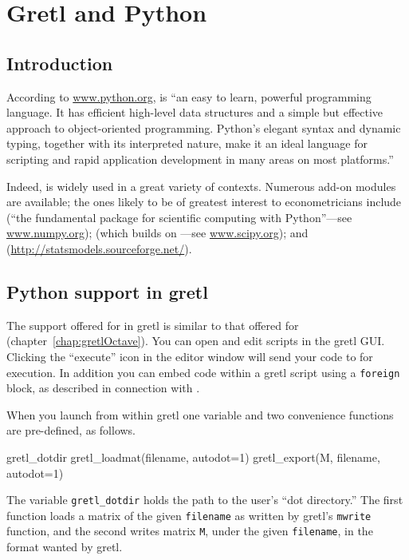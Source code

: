 \chapter{Gretl and Python}
\label{chap:gretlPython}

\section{Introduction}
\label{Python-intro}

According to \url{www.python.org},  is ``an easy to learn,
powerful programming language. It has efficient high-level data
structures and a simple but effective approach to object-oriented
programming. Python's elegant syntax and dynamic typing, together with
its interpreted nature, make it an ideal language for scripting and
rapid application development in many areas on most platforms.''

Indeed,  is widely used in a great variety of
contexts. Numerous add-on modules are available; the ones likely to be
of greatest interest to econometricians include  (``the
fundamental package for scientific computing with Python''---see
\url{www.numpy.org});  (which builds on ---see
\url{www.scipy.org}); and 
(\url{http://statsmodels.sourceforge.net/}).

\section{Python support in gretl}
\label{sec:Python-support}

The support offered for  in gretl is similar to that
offered for  (chapter~\ref{chap:gretlOctave}). You can
open and edit  scripts in the gretl GUI.  Clicking
the ``execute'' icon in the editor window will send your code to
 for execution. In addition you can embed 
code within a gretl script using a \texttt{foreign} block, as
described in connection with .

When you launch  from within gretl one variable and
two convenience functions are pre-defined, as follows.
\begin{code}
gretl_dotdir
gretl_loadmat(filename, autodot=1)
gretl_export(M, filename, autodot=1)
\end{code}
The variable \verb|gretl_dotdir| holds the path to the user's ``dot
directory.''  The first function loads a matrix of the given
\texttt{filename} as written by gretl's \texttt{mwrite}
function, and the second writes matrix \texttt{M}, under the given
\texttt{filename}, in the format wanted by gretl.

